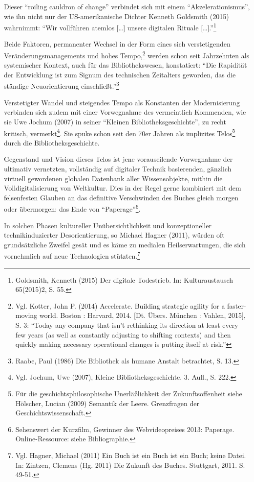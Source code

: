 \documentclass[a4paper,
fontsize=11pt,
oneside,
numbers=noperiodatend,
parskip=half-,
bibliography=totoc,
final
]{scrartcl}
\begin{document}
Dieser \enquote{roiling cauldron of change} verbindet sich mit einem
\enquote{Akzelerationismus}, wie ihn nicht nur der US-amerikanische
Dichter Kenneth Goldsmith (2015) wahrnimmt: \enquote{Wir vollführen
atemlos {[}\ldots{}{]} unsere digitalen Rituale
{[}\ldots{}{]}.}\footnote{Goldsmith, Kenneth (2015) Der digitale
  Todestrieb. In: Kulturaustausch 65(2015)2, S. 55.}

Beide Faktoren, permanenter Wechsel in der Form eines sich
verstetigenden Veränderungsmanagements und hohes Tempo,\footnote{Vgl.
  Kotter, John P. (2014) Accelerate. Building strategic agility for a
  faster-moving world. Boston : Harvard, 2014. {[}Dt. Übers. München :
  Vahlen, 2015{]}, S. 3: \enquote{Today any company that isn't
  rethinking its direction at least every few years (as well as
  constantly adjusting to shifting contexts) and then quickly making
  necessary operational changes is putting itself at risk.}} werden
schon seit Jahrzehnten als systemischer Kontext, auch für das
Bibliothekswesen, konstatiert: \enquote{Die Rapidität der Entwicklung
ist zum Signum des technischen Zeitalters geworden, das die ständige
Neuorientierung einschließt.}\footnote{Raabe, Paul (1986) Die Bibliothek
  als humane Anstalt betrachtet, S. 13.}

Verstetigter Wandel und steigendes Tempo als Konstanten der
Modernisierung verbinden sich zudem mit einer Vorwegnahme des
vermeintlich Kommenden, wie sie Uwe Jochum (2007) in seiner
\enquote{Kleinen Bibliotheksgeschichte}, zu recht kritisch,
vermerkt\footnote{Vgl. Jochum, Uwe (2007), Kleine Bibliotheksgeschichte.
  3. Aufl., S. 222.}. Sie spuke schon seit den 70er Jahren als
implizites Telos\footnote{Für die geschichtsphilosophische
  Unerläßlichkeit der Zukunftsoffenheit siehe Hölscher, Lucian (2009)
  Semantik der Leere. Grenzfragen der Geschichtswissenschaft.} durch die
Bibliotheksgeschichte.

Gegenstand und Vision dieses Telos ist jene vorauseilende Vorwegnahme
der ultimativ vernetzten, vollständig auf digitaler Technik basierenden,
gänzlich virtuell gewordenen globalen Datenbank aller Wissensobjekte,
mithin die Volldigitalisierung von Weltkultur. Dies in der Regel gerne
kombiniert mit dem felsenfesten Glauben an das definitive Verschwinden
des Buches gleich morgen oder übermorgen: das Ende von
\enquote{Paperage}\footnote{Sehenswert der Kurzfilm, Gewinner des
  Webvideopreises 2013: Paperage. Online-Ressource: siehe Bibliographie.}.

In solchen Phasen kultureller Unübersichtlichkeit und konzeptioneller
technikinduzierter Desorientierung, so Michael Hagner (2011), würden oft
grundsätzliche Zweifel gesät und es käme zu medialen Heilserwartungen,
die sich vornehmlich auf neue Technologien stützten.\footnote{Vgl.
  Hagner, Michael (2011) Ein Buch ist ein Buch ist ein Buch; keine
  Datei. In: Zintzen, Clemens (Hg. 2011) Die Zukunft des Buches.
  Stuttgart, 2011. S. 49-51.}
\end{document}
